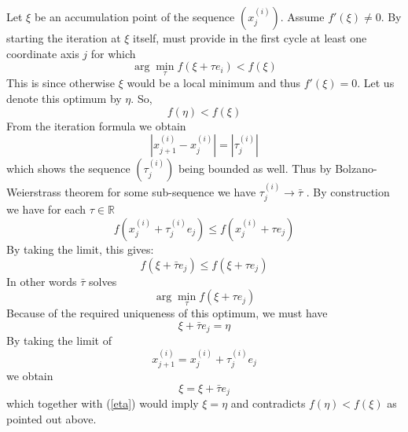 \documentclass[17pt]{extarticle}
\begin{document}
Let $\xi$ be an accumulation point of the sequence $(x^{(i)}_j)$. Assume $f'(\xi)\neq 0$.
By starting the iteration at $\xi$ itself, must provide 
in the first cycle at least one coordinate axis $j$ for which 
$$
\arg \min_{\tau}f(\xi+\tau e_i)<f(\xi)
$$
This is since otherwise $\xi$ would be a local minimum and thus $f'(\xi)=0$.
Let us denote this optimum by $\eta$. So,
$$
f(\eta)<f(\xi)
$$
From the iteration formula we obtain
$$
|x_{j+1}^{(i)}-x_{j}^{(i)}|=|\tau_{j}^{(i)}|
$$
which shows the sequence $(\tau_j^{(i)})$ being bounded as well.
Thus by Bolzano-Weierstrass theorem for some sub-sequence we have 
$\tau_j^{(i)}\rightarrow \bar{\tau}$ . By construction we have for each $\tau\in \mathbb{R}$
$$
f(x_j^{(i)}+\tau_j^{(i)}e_j)\leq f(x_j^{(i)}+\tau e_j)
$$
By taking the limit, this gives:
$$
f(\xi+\bar{\tau}e_j)\leq f(\xi+\tau e_j)
$$
In other words $\bar{\tau}$ solves
$$
\arg \min_{\tau}f(\xi+\tau e_j)
$$
Because of the required uniqueness of this optimum,
we must have 
\begin{equation} \label{eta}
\xi+\bar{\tau} e_j=\eta
\end{equation}
By taking the limit of 
$$
x_{j+1}^{(i)}=x_j^{(i)}+\tau_j^{(i)}e_j
$$
we obtain
$$
\xi=\xi+\bar{\tau}e_j
$$
which together with (\ref{eta}) would imply $\xi=\eta$ and contradicts $f(\eta)<f(\xi)$
as pointed out above.
\end{document}
